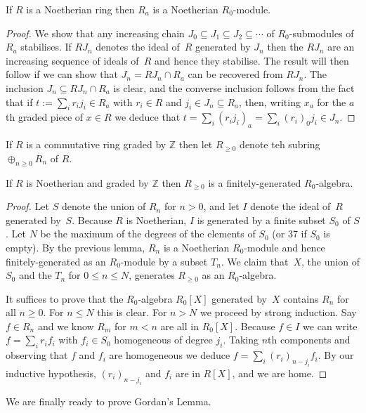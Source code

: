 \begin{lemma} If $R$ is a Noetherian ring then $R_a$ is a Noetherian $R_0$-module.
\end{lemma}
\begin{proof} We show that any increasing chain $J_0\subseteq J_1\subseteq J_2\subseteq\cdots$ of $R_0$-submodules of $R_a$ stabilises. If $RJ_n$ denotes the ideal of~$R$ generated by $J_n$ then the $RJ_n$ are an increasing sequence of ideals of~$R$ and hence they stabilise. The result will then follow if we can show that $J_n=RJ_n\cap R_a$ can be recovered from $RJ_n$. The inclusion $J_n\subseteq RJ_n\cap R_a$ is clear, and the converse inclusion follows from the fact that if $t:=\sum_i r_i j_i\in R_a$ with $r_i\in R$ and $j_i\in J_n\subseteq R_a$, then, writing $x_a$ for the $a$th graded piece of $x\in R$ we deduce that $t=\sum_i(r_ij_i)_a=\sum_i(r_i)_0j_i\in J_n$.
\end{proof}

If $R$ is a commutative ring graded by $\mathbb{Z}$ then let $R_{\geq0}$ denote teh subring $\oplus_{n\geq0}R_n$ of $R$.

\begin{theorem} If $R$ is Noetherian and graded by $\mathbb{Z}$ then $R_{\geq0}$ is a finitely-generated $R_0$-algebra.
\end{theorem}
\begin{proof}
  Let $S$ denote the union of $R_n$ for $n>0$, and let $I$ denote the ideal of~$R$ generated by~$S$. Because $R$ is Noetherian, $I$ is generated by a finite subset $S_0$ of $S$. Let $N$ be the maximum of the degrees of the elements of $S_0$ (or 37 if $S_0$ is empty). By the previous lemma, $R_n$ is a Noetherian $R_0$-module and hence finitely-generated as an $R_0$-module by a subset $T_n$. We claim that~$X$, the union of $S_0$ and the $T_n$ for $0\leq n\leq N$, generates $R_{\geq0}$ as an $R_0$-algebra.

  It suffices to prove that the $R_0$-algebra $R_0[X]$ generated by~$X$ contains $R_n$ for all $n\geq0$. For $n\leq N$ this is clear. For $n>N$ we proceed by strong induction. Say $f\in R_n$ and we know $R_m$ for $m<n$ are all in $R_0[X]$. Because $f\in I$ we can write $f=\sum_i r_if_i$ with $f_i\in S_0$ homogeneous of degree $j_i$. Taking $n$th components and observing that $f$ and $f_i$ are homogeneous we deduce $f=\sum_i(r_i)_{n-j_i}f_i$. By our inductive hypothesis, $(r_i)_{n-j_i}$ and $f_i$ are in $R[X]$, and we are home.
\end{proof}

We are finally ready to prove Gordan's Lemma.
  
